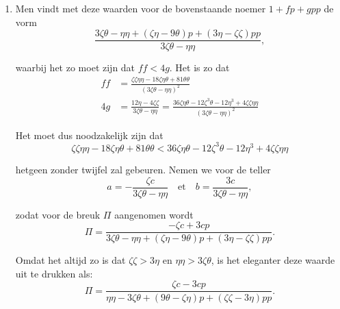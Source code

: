 \documentclass[10pt,a4paper]{article}
\newcommand{\switchenum}{\setcounter{enumi}{\arabic{enumi}-1}\switchcolumn}
\begin{document}
\begin{paracol}{2}
\begin{enumerate}[topsep=1px]
		\switchenum
		\item Men vindt met deze waarden voor de bovenstaande noemer $1+fp+gpp$ de vorm
		\[
			\frac{3\zeta \theta - \eta \eta + (\zeta \eta - 9\theta)p + (3\eta -\zeta \zeta)pp}{3\zeta \theta - \eta \eta},
		\]
		\par waarbij het zo moet zijn dat $ff< 4g$. Het is zo dat
		\begin{align*}
			ff &= \frac{\zeta \zeta \eta \eta -18\zeta \eta \theta + 81 \theta \theta}{(3\zeta \theta - \eta \eta)^2}\\
			4g &= \frac{12\eta - 4\zeta \zeta }{3\zeta \theta-\eta \eta} = \frac{36\zeta \eta \theta - 12 \zeta ^3\theta - 12 \eta^3+4\zeta \zeta \eta \eta}{(3\zeta \theta - \eta \eta)^2}
		\end{align*}
		\par Het moet dus noodzakelijk zijn dat
		\[
			\zeta \zeta \eta \eta -18 \zeta \eta \theta +81 \theta \theta < 36 \zeta \eta \theta - 12 \zeta^3\theta -12\eta^3 + 4 \zeta \zeta \eta \eta
		\]
		\par hetgeen zonder twijfel zal gebeuren. Nemen we voor de teller
		\[
			a = - \frac{\zeta c}{3\zeta \theta - \eta \eta} \quad \text{et}\quad b = \frac{3c}{3\zeta \theta - \eta \eta},
		\]
		\par zodat voor de breuk $\Pi$ aangenomen wordt
		\[
			\Pi = \frac{-\zeta c + 3cp}{3\zeta \theta -\eta \eta +(\zeta \eta - 9\theta)p+(3\eta - \zeta \zeta)pp}.
		\]
		\par Omdat het altijd zo is dat $\zeta \zeta > 3\eta$ en $\eta \eta > 3\zeta \theta$, is het eleganter deze waarde uit te drukken als:
		\[
			\Pi = \frac{\zeta c - 3cp }{\eta \eta - 3\zeta \theta +(9\theta - \zeta \eta)p + (\zeta \zeta - 3\eta)pp}.
		\]

		
		\switchcolumn*
		

\end{enumerate}
\end{paracol}
\end{document}
